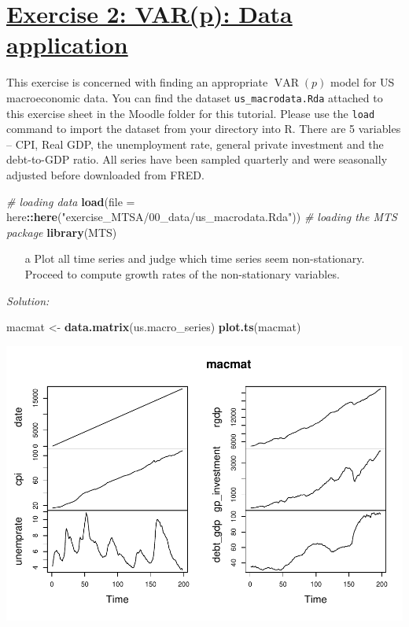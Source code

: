 \documentclass[12pt,a4paper]{article}
\newcommand{\VAR}{\operatorname{VAR}} %
\newcommand{\tmpsection}[1]{}
\let\tmpsection=\section
\renewcommand{\section}[1]{\tmpsection{\underline{#1}} }
\newenvironment{Shaded}{\begin{snugshade}}{\end{snugshade}}
\newcommand{\CommentTok}[1]{\textcolor[rgb]{0.56,0.35,0.01}{\textit{#1}}}
\newcommand{\DataTypeTok}[1]{\textcolor[rgb]{0.13,0.29,0.53}{#1}}
\newcommand{\KeywordTok}[1]{\textcolor[rgb]{0.13,0.29,0.53}{\textbf{#1}}}
\newcommand{\NormalTok}[1]{#1}
\newcommand{\OperatorTok}[1]{\textcolor[rgb]{0.81,0.36,0.00}{\textbf{#1}}}
\newcommand{\StringTok}[1]{\textcolor[rgb]{0.31,0.60,0.02}{#1}}
\begin{document}
\hypertarget{exercise-2-varp-data-application}{%
\section{Exercise 2: VAR(p): Data
application}\label{exercise-2-varp-data-application}}

This exercise is concerned with finding an appropriate \(\VAR(p)\) model
for US macroeconomic data. You can find the dataset
\texttt{us\_macrodata.Rda} attached to this exercise sheet in the Moodle
folder for this tutorial. Please use the \texttt{load} command to import
the dataset from your directory into R. There are 5 variables -- CPI,
Real GDP, the unemployment rate, general private investment and the
debt-to-GDP ratio. All series have been sampled quarterly and were
seasonally adjusted before downloaded from FRED.

\begin{Shaded}
\begin{Highlighting}[]
\CommentTok{# loading data}
\KeywordTok{load}\NormalTok{(}\DataTypeTok{file =}\NormalTok{ here}\OperatorTok{::}\KeywordTok{here}\NormalTok{(}\StringTok{"exercise_MTSA/00_data/us_macrodata.Rda"}\NormalTok{))}
\CommentTok{# loading the MTS package}
\KeywordTok{library}\NormalTok{(MTS)}
\end{Highlighting}
\end{Shaded}

\begin{itemize}
  \item[a] Plot all time series and judge which time series seem non-stationary. Proceed to compute growth rates of the non-stationary variables.
\end{itemize}

\emph{Solution:}

\begin{Shaded}
\begin{Highlighting}[]
\NormalTok{macmat <-}\StringTok{ }\KeywordTok{data.matrix}\NormalTok{(us.macro_series)}
\KeywordTok{plot.ts}\NormalTok{(macmat)}
\end{Highlighting}
\end{Shaded}

\includegraphics{solution_exercise_5_files/figure-latex/unnamed-chunk-3-1.pdf}
\end{document}
